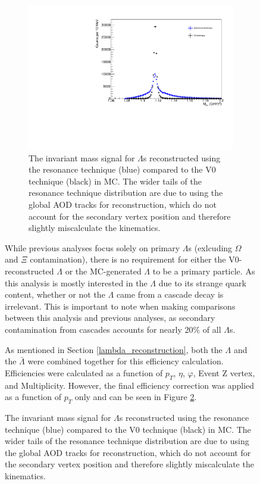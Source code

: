 \documentclass[ALICE,manyauthors]{ALICE_analysis_notes}
\begin{document}
\begin{figure}[ht]
\begin{figure}[ht]
\centering
\includegraphics[width=4in]{figures/lambda_mass_resonance_mc.pdf}
\caption{The invariant mass signal for $\Lambda$s reconstructed using the resonance technique (blue) compared to the V0 technique (black) in MC. The wider tails of the resonance technique distribution are due to using the global AOD tracks for reconstruction, which do not account for the secondary vertex position and therefore slightly miscalculate the kinematics.}
\label{lambda_eff}
\end{figure}

While previous analyses focus solely on primary $\Lambda$s (exlcuding $\Omega$ and $\Xi$ contamination), there is no requirement for either the V0-reconstructed $\Lambda$ or the MC-generated $\Lambda$ to be a primary particle. As this analysis is mostly interested in the $\Lambda$ due to its strange quark content, whether or not the $\Lambda$ came from a cascade decay is irrelevant. This is important to note when making comparisons between this analysis and previous analyses, as secondary contamination from cascades accounts for nearly 20\% of all $\Lambda$s.

As mentioned in Section \ref{lambda_reconstruction}, both the $\Lambda$ and the $\bar{\Lambda}$ were combined together for this efficiency calculation. Efficiencies were calculated as a function of $p_T$, $\eta$, $\varphi$, Event Z vertex, and Multiplicity. However, the final efficiency correction was applied as a function of $p_T$ only and can be seen in Figure \ref{lambda_eff}.


\end{figure}
\end{document}
